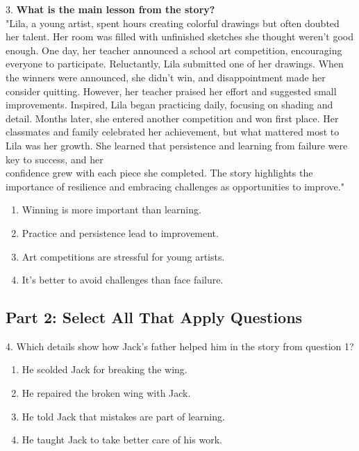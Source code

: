 \documentclass[12pt]{article}
\begin{document}
\vspace{1em}
3. \textbf{What is the main lesson from the story?}\\
"Lila, a young artist, spent hours creating colorful drawings but often doubted her talent. Her room was filled with unfinished sketches she thought weren’t good enough. One day, her teacher announced a school art competition, encouraging everyone to participate. Reluctantly, Lila submitted one of her drawings. When the winners were announced, she didn’t win, and disappointment made her consider quitting. However, her teacher praised her effort and suggested small improvements. Inspired, Lila began practicing daily, focusing on shading and detail. Months later, she entered another competition and won first place. Her classmates and family celebrated her achievement, but what mattered most to Lila was her growth. She learned that persistence and learning from failure were key to success, and her \\confidence grew with each piece she completed. The story highlights the \\importance of resilience and embracing challenges as opportunities to improve."\\
\begin{enumerate}[label=\Alph*.]
    \item Winning is more important than learning.  
    \item Practice and persistence lead to improvement.  
    \item Art competitions are stressful for young artists.  
    \item It’s better to avoid challenges than face failure.  
\end{enumerate}

\vspace{1cm}

\subsection*{Part 2: Select All That Apply Questions}

4. Which details show how Jack’s father helped him in the story from question 1?\\
\begin{enumerate}[label=\Alph*.]
    \item He scolded Jack for breaking the wing.  
    \item He repaired the broken wing with Jack.  
    \item He told Jack that mistakes are part of learning.  
    \item He taught Jack to take better care of his work.  
\end{enumerate}
\end{document}
